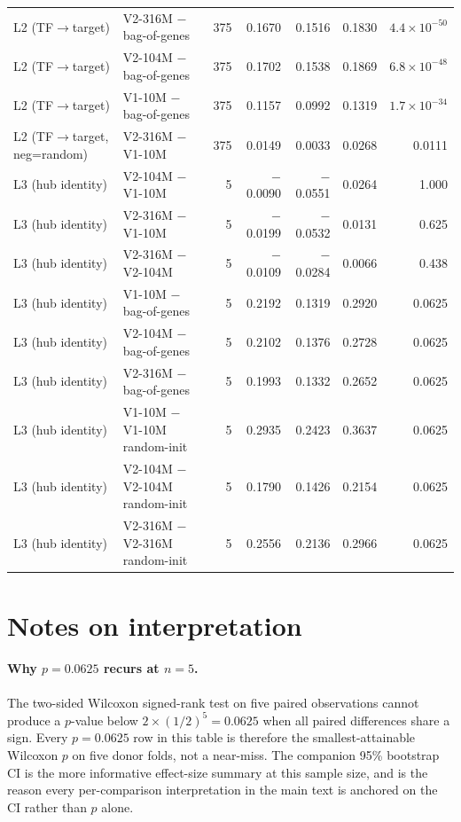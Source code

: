 \documentclass[11pt]{article}
\begin{document}
{\begin{longtable}{@{}l p{4.6cm} r r r r r@{}}
L2 (TF$\to$target) & V2-316M $-$ bag-of-genes & 375 &  0.1670 &  0.1516 &  0.1830 & $4.4\times10^{-50}$ \\
L2 (TF$\to$target) & V2-104M $-$ bag-of-genes & 375 &  0.1702 &  0.1538 &  0.1869 & $6.8\times10^{-48}$ \\
L2 (TF$\to$target) & V1-10M  $-$ bag-of-genes & 375 &  0.1157 &  0.0992 &  0.1319 & $1.7\times10^{-34}$ \\
L2 (TF$\to$target, neg=random) & V2-316M $-$ V1-10M & 375 &  0.0149 &  0.0033 &  0.0268 & 0.0111 \\
\midrule
L3 (hub identity) & V2-104M $-$ V1-10M        &   5 & $-$0.0090 & $-$0.0551 &  0.0264 & 1.000 \\
L3 (hub identity) & V2-316M $-$ V1-10M        &   5 & $-$0.0199 & $-$0.0532 &  0.0131 & 0.625 \\
L3 (hub identity) & V2-316M $-$ V2-104M       &   5 & $-$0.0109 & $-$0.0284 &  0.0066 & 0.438 \\
L3 (hub identity) & V1-10M  $-$ bag-of-genes  &   5 &  0.2192 &  0.1319 &  0.2920 & 0.0625 \\
L3 (hub identity) & V2-104M $-$ bag-of-genes  &   5 &  0.2102 &  0.1376 &  0.2728 & 0.0625 \\
L3 (hub identity) & V2-316M $-$ bag-of-genes  &   5 &  0.1993 &  0.1332 &  0.2652 & 0.0625 \\
L3 (hub identity) & V1-10M  $-$ V1-10M random-init    &   5 &  0.2935 &  0.2423 &  0.3637 & 0.0625 \\
L3 (hub identity) & V2-104M $-$ V2-104M random-init   &   5 &  0.1790 &  0.1426 &  0.2154 & 0.0625 \\
L3 (hub identity) & V2-316M $-$ V2-316M random-init   &   5 &  0.2556 &  0.2136 &  0.2966 & 0.0625 \\
\bottomrule
\end{longtable}
}

\section{Notes on interpretation}

\paragraph{Why $p = 0.0625$ recurs at $n=5$.} The two-sided Wilcoxon signed-rank test on five paired observations cannot produce a $p$-value below $2 \times (1/2)^5 = 0.0625$ when all paired differences share a sign. Every $p = 0.0625$ row in this table is therefore the smallest-attainable Wilcoxon $p$ on five donor folds, not a near-miss. The companion 95\% bootstrap CI is the more informative effect-size summary at this sample size, and is the reason every per-comparison interpretation in the main text is anchored on the CI rather than $p$ alone.
\end{document}
